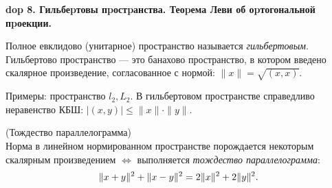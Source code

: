 \textbf{\LARGE dop 8. Гильбеpтовы пpостpанства. Теоpема Леви об оpтогональной пpоекции.}

\begin{definition}
Полное евклидово (унитарное) пространство называется \emph{гильбертовым}. Гильбертово пространство --- это банахово пространство, в котором введено скалярное произведение, согласованное с нормой: $\|x\| = \sqrt{(x, x)}$.
\end{definition}

\begin{Commentwhite}
Примеры: пространство $l_2, L_2$. В гильбертовом пространстве справедливо неравенство КБШ: $|(x, y)|\le\|x\|\cdot\|y\|$.
\end{Commentwhite}

\begin{theorem}
(Тождество параллелограмма)\\
Норма в линейном нормированном пространстве порождается некоторым скалярным произведением $\Leftrightarrow$ выполняется \emph{тождество параллелограмма}:
\begin{equation}
    \label{тождество параллелограмма}
    \|x + y\|^2 + \|x - y\|^2 = 2\|x\|^2 + 2\|y\|^2.
\end{equation}
\end{theorem}
